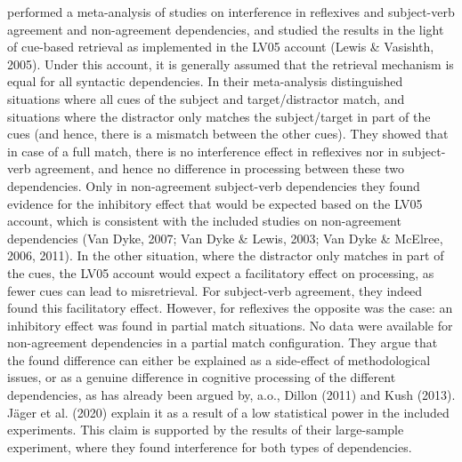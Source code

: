 \documentclass[11pt]{article} %
\begin{document}
\cite{jager+17} performed a meta-analysis of studies on interference in reflexives and subject-verb agreement and non-agreement dependencies, and studied the results in the light of cue-based retrieval as implemented in the LV05 account (Lewis \& Vasishth, 2005). Under this account, it is generally assumed that the retrieval mechanism is equal for all syntactic dependencies. In their meta-analysis \cite{jager+17} distinguished situations where all cues of the subject and target/distractor match, and situations where the distractor only matches the subject/target in part of the cues (and hence, there is a mismatch between the other cues). They showed that in case of a full match, there is no interference effect in reflexives nor in subject-verb agreement, and hence no difference in processing between these two dependencies. Only in non-agreement subject-verb dependencies they found evidence for the inhibitory effect that would be expected based on the LV05 account, which is consistent with the included studies on non-agreement dependencies (Van Dyke, 2007; Van Dyke \& Lewis, 2003; Van Dyke \& McElree, 2006, 2011). In the other situation, where the distractor only matches in part of the cues, the LV05 account would expect a facilitatory effect on processing, as fewer cues can lead to misretrieval. For subject-verb agreement, they indeed found this facilitatory effect. However, for reflexives the opposite was the case: an inhibitory effect was found in partial match situations. No data were available for non-agreement dependencies in a partial match configuration. They argue that the found difference can either be explained as a side-effect of methodological issues, or as a genuine difference in cognitive processing of the different dependencies, as has already been argued by, a.o., Dillon (2011) and Kush (2013). J{\"a}ger et al. (2020) explain it as a result of a low statistical power in the included experiments. This claim is supported by the results of their large-sample experiment, where they found interference for both types of dependencies.
\end{document}

